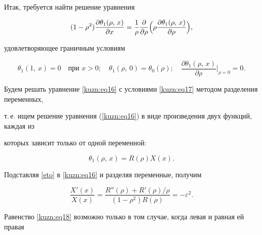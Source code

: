 Итак, требуется найти решение уравнения

\begin{equation}

\label{kuzn:eq16}

(1-\rho ^2)\frac{\partial \theta _1 (\rho,\,x)}{\partial x}=\frac{1}{\rho}\frac{\partial }{\partial

\rho}\Bigl(\rho \frac{\partial \theta _1 (\rho,\,x)}{\partial \rho} \Bigr),

\end{equation}

удовлетворяющее граничным условиям

\begin{equation}

\label{kuzn:eq17}

\theta_1(1,\,x) = 0 \quad \text{при $x > 0$}; \quad  \theta_1(\rho,\, 0) = \theta_0(\rho); \quad  \frac{\partial

\theta _1 (\rho,\,x)}{\partial \rho } \Bigr|_{\rho =0} =0.

\end{equation}



Будем решать уравнение \eqref{kuzn:eq16} с условиями \eqref{kuzn:eq17} методом разделения переменных,

т.\,е. ищем решение уравнения (\ref{kuzn:eq16}) в виде произведения двух функций, каждая из

которых зависит только от одной переменной: 

\begin{equation}

\theta_1(\rho,\, x)=R(\rho) X(x).

\label{eto}

\end{equation}

Подставляя \eqref{eto} в \eqref{kuzn:eq16} и разделяя переменные, получим

\begin{equation}

\label{kuzn:eq18}

\frac{X'(x)}{X(x)}=\frac{R''(\rho

)+R'(\rho )/{\rho }}{(1-\rho ^2)R(\rho)}=-\varepsilon^2.

\end{equation}



Равенство \eqref{kuzn:eq18} возможно только в том случае, когда левая и равная ей правая

